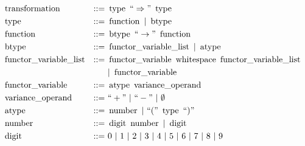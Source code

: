 \documentclass[../../Dissertation.tex]{subfiles}
\begin{document}
\begin{align*}
  &\transformterminal &::=&\ \typeterminal\ ``\Rightarrow"\ \typeterminal\\
  &\typeterminal &::=&\ \functionterminal\ |\ \btypeterminal\\
  &\functionterminal &::=&\ \btypeterminal\ ``\rightarrow"\ \functionterminal\\
  &\btypeterminal &::=&\ \variablelistterminal\ |\ \atypeterminal\\
  &\variablelistterminal &::=&\ \variableterminal\ \whitespaceterminal\ \variablelistterminal\\
  &&&\ |\ \variableterminal\\
  &\variableterminal &::=&\ \atypeterminal\ \varianceterminal\\
  &\varianceterminal &::=&\ ``+"\ |\ ``-"\ |\ \emptyset\\
  &\atypeterminal &::=&\ \numberterminal\ |\ ``("\ \typeterminal\ ``)"\\
  &\numberterminal &::=&\ \digitterminal\ \numberterminal\ |\ \digitterminal\\
  &\digitterminal &::=&\ 0\ |\ 1\ |\ 2\ |\ 3\ |\ 4\ |\ 5\ |\ 6\ |\ 7\ |\ 8\ |\ 9
\end{align*}
\end{document}
